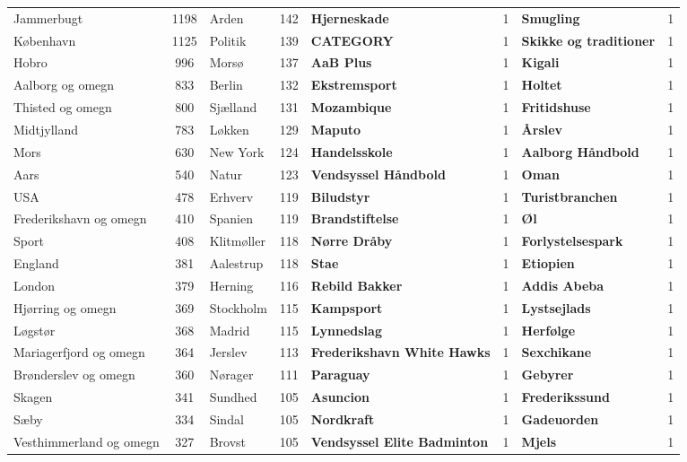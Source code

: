 \begin{table*}[h]
\begin{tabular}{l|c|l|c|l|c|l|c}
		Jammerbugt & 1198 & Arden & 142 & \textbf{Hjerneskade} & 1 & \textbf{Smugling} & 1 \\
		København & 1125 & Politik & 139 & \textbf{CATEGORY} & 1 & \textbf{Skikke og traditioner} & 1 \\
		Hobro & 996 & Morsø & 137 & \textbf{AaB Plus} & 1 & \textbf{Kigali} & 1 \\
		Aalborg og omegn & 833 & Berlin & 132 & \textbf{Ekstremsport} & 1 & \textbf{Holtet} & 1 \\
		Thisted og omegn & 800 & Sjælland & 131 & \textbf{Mozambique} & 1 & \textbf{Fritidshuse} & 1 \\
		Midtjylland & 783 & Løkken & 129 & \textbf{Maputo} & 1 & \textbf{Årslev} & 1 \\
		Mors & 630 & New York & 124 & \textbf{Handelsskole} & 1 & \textbf{Aalborg Håndbold} & 1 \\
		Aars & 540 & Natur & 123 & \textbf{Vendsyssel Håndbold} & 1 & \textbf{Oman} & 1 \\
		USA & 478 & Erhverv & 119 & \textbf{Biludstyr} & 1 & \textbf{Turistbranchen} & 1 \\
		Frederikshavn og omegn & 410 & Spanien & 119 & \textbf{Brandstiftelse} & 1 & \textbf{Øl} & 1 \\
		Sport & 408 & Klitmøller & 118 & \textbf{Nørre Dråby} & 1 & \textbf{Forlystelsespark} & 1 \\
		England & 381 & Aalestrup & 118 & \textbf{Stae} & 1 & \textbf{Etiopien} & 1 \\
		London & 379 & Herning & 116 & \textbf{Rebild Bakker} & 1 & \textbf{Addis Abeba} & 1 \\
		Hjørring og omegn & 369 & Stockholm & 115 & \textbf{Kampsport} & 1 & \textbf{Lystsejlads} & 1 \\
		Løgstør & 368 & Madrid & 115 & \textbf{Lynnedslag} & 1 & \textbf{Herfølge} & 1 \\
		Mariagerfjord og omegn & 364 & Jerslev & 113 & \textbf{Frederikshavn White Hawks} & 1 & \textbf{Sexchikane} & 1 \\
		Brønderslev og omegn & 360 & Nørager & 111 & \textbf{Paraguay} & 1 & \textbf{Gebyrer} & 1 \\
		Skagen & 341 & Sundhed & 105 & \textbf{Asuncion} & 1 & \textbf{Frederikssund} & 1 \\
		Sæby & 334 & Sindal & 105 & \textbf{Nordkraft} & 1 & \textbf{Gadeuorden} & 1 \\
		Vesthimmerland og omegn & 327 & Brovst & 105 & \textbf{Vendsyssel Elite Badminton} & 1 & \textbf{Mjels} & 1 \\

\end{tabular}
\end{table*}
